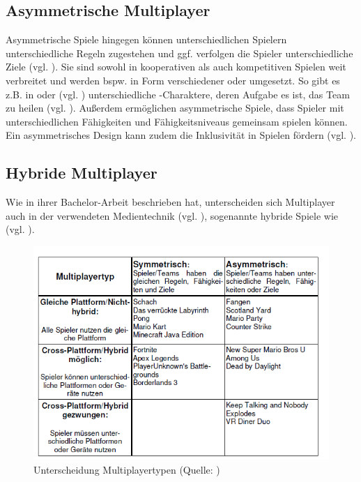 \subsection{Asymmetrische Multiplayer}
Asymmetrische Spiele hingegen können unterschiedlichen Spielern unterschiedliche Regeln zugestehen und ggf. verfolgen die Spieler unterschiedliche Ziele (vgl. \citealp[S. 12]{adams_fundamentals_2013}). Sie sind sowohl in kooperativen als auch kompetitiven Spielen weit verbreitet und werden bspw. in Form verschiedener  oder  umgesetzt. So gibt es z.B. in  oder  (vgl. \citealp{noauthor_league_2025, noauthor_overwatch_nodate}) unterschiedliche -Charaktere, deren Aufgabe es ist, das Team zu heilen (vgl. \citealp[S. 307f]{smilovitch_birdquestvr_2019}).
Außerdem ermöglichen asymmetrische Spiele, dass Spieler mit unterschiedlichen Fähigkeiten und Fähigkeitsniveaus gemeinsam spielen können. Ein asymmetrisches Design kann zudem die Inklusivität in Spielen fördern (vgl. \citealp[S. 308]{smilovitch_birdquestvr_2019}).

\subsection{Hybride Multiplayer}\label{sec:hybrid-multiplayer}
Wie \citeauthor{lotz_konzeption_2021} in ihrer Bachelor-Arbeit beschrieben hat, unterscheiden sich Multiplayer auch in der verwendeten Medientechnik (vgl. \citealp[S. 6f]{lotz_konzeption_2021}), sogenannte hybride Spiele wie  (vgl. \citealp{nintendo_mario_2012}).

\begin{figure}[ht]
\centering
\includegraphics[width=1\linewidth]{content/pictures/lotz_hybrid_multiplayer.PNG}
\caption{Unterscheidung Multiplayertypen (Quelle: \citealp[S.6]{lotz_konzeption_2021})}
\label{fig:lotz_multiplayer_types}
\end{figure}

